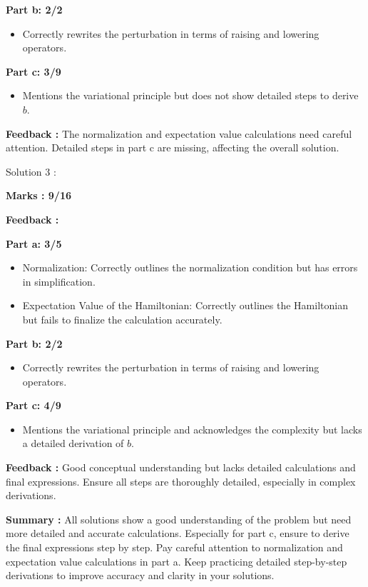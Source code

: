 \documentclass[a4paper,11pt]{article}
\begin{document}
\textbf{Part b: 2/2}
\begin{itemize}
    \item Correctly rewrites the perturbation in terms of raising and lowering operators.
\end{itemize}

\textbf{Part c: 3/9}
\begin{itemize}
    \item Mentions the variational principle but does not show detailed steps to derive $b$.
\end{itemize}

\textbf{Feedback :}
The normalization and expectation value calculations need careful attention. Detailed steps in part c are missing, affecting the overall solution.


Solution 3 :

\textbf{Marks : 9/16}

\textbf{Feedback :}

\textbf{Part a: 3/5}
\begin{itemize}
    \item Normalization: Correctly outlines the normalization condition but has errors in simplification.
    \item Expectation Value of the Hamiltonian: Correctly outlines the Hamiltonian but fails to finalize the calculation accurately.
\end{itemize}

\textbf{Part b: 2/2}
\begin{itemize}
    \item Correctly rewrites the perturbation in terms of raising and lowering operators.
\end{itemize}

\textbf{Part c: 4/9}
\begin{itemize}
    \item Mentions the variational principle and acknowledges the complexity but lacks a detailed derivation of $b$.
\end{itemize}

\textbf{Feedback :}
Good conceptual understanding but lacks detailed calculations and final expressions. Ensure all steps are thoroughly detailed, especially in complex derivations.

\textbf{Summary :}
All solutions show a good understanding of the problem but need more detailed and accurate calculations. Especially for part c, ensure to derive the final expressions step by step. Pay careful attention to normalization and expectation value calculations in part a. Keep practicing detailed step-by-step derivations to improve accuracy and clarity in your solutions.
\end{document}
